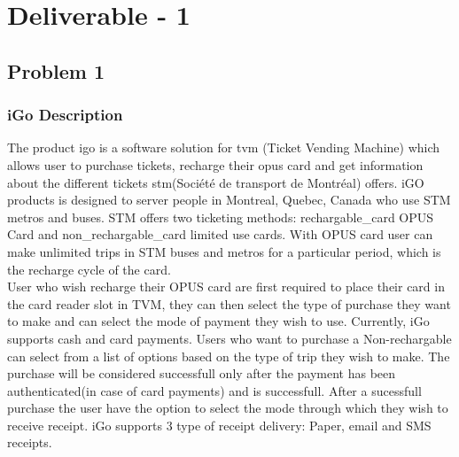 \documentclass[a4paper,12pt]{report}
\begin{document}

\newpage

\tableofcontents




\chapter*{\centering Deliverable - 1}



%
%

\section{Problem 1}
\subsection{iGo Description}
The product \gls{igo} is a software solution for \gls{tvm} (Ticket Vending Machine) which allows user to purchase tickets, recharge their \gls{opus} card and get information about the different tickets \gls{stm}(Société de transport de Montréal) offers. iGO products is designed to server people in Montreal, Quebec, Canada who use STM metros and buses. STM offers two ticketing methods: \gls{rechargable_card} OPUS Card and \gls{non_rechargable_card} limited use cards. With OPUS card user can make unlimited trips in STM buses and metros for a particular period, which is the recharge cycle of the card. \\


User who wish recharge their OPUS card are first required to place their card in the card reader slot in TVM, they can then select the type of purchase they want to make and can select the mode of payment they wish to use. Currently, iGo supports cash and card payments. Users who want to purchase a Non-rechargable can select from a list of options based on the type of trip they wish to make. The purchase will be considered successfull only after the payment has been authenticated(in case of card payments) and is successfull. After a sucessfull purchase the user have the option to select the mode through which they wish to receive receipt. iGo supports 3 type of receipt delivery: Paper, email and SMS receipts. \\
\end{document}

